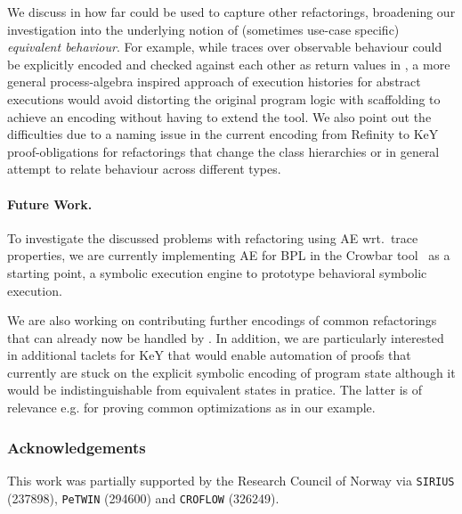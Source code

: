 \documentclass[runningheads]{llncs}
\begin{document}
We discuss in how far \Refinity{} could be used to capture other refactorings, broadening our investigation into the underlying notion of (sometimes use-case specific) \textit{equivalent behaviour}.
For example, while traces over observable behaviour could be explicitly encoded and checked against each other as return values in \Refinity{}, a more general process-algebra inspired approach of execution histories for abstract executions would avoid distorting the original program logic with scaffolding to achieve an encoding without having to extend the tool.
We also point out the difficulties due to a naming issue in the current encoding from Refinity to KeY proof-obligations for refactorings that change the class hierarchies or in general attempt to relate behaviour across different types.

\paragraph{Future Work.} 
To investigate the discussed problems with refactoring using AE wrt.\ trace properties, we are currently implementing AE for BPL in the Crowbar tool~\cite{crowbar} as a starting point, a symbolic execution engine to prototype behavioral symbolic execution.

We are also working on contributing further encodings of common refactorings that can already now be handled by \Refinity{}.
In addition, we are particularly interested in additional taclets for KeY that would enable automation of proofs
that currently are stuck on the explicit symbolic encoding of program state although it would be indistinguishable from equivalent states in pratice.
The latter is of relevance e.g. for proving common optimizations as in our  example.

\subsubsection*{Acknowledgements}
This work was partially supported by the Research Council of Norway via \texttt{SIRIUS} (237898), \texttt{PeTWIN} (294600) and \texttt{CROFLOW} (326249).
%

% 



\end{document}
